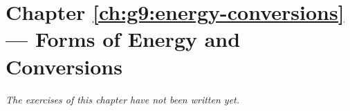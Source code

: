 \section*{Chapter \ref{ch:g9:energy-conversions} --- Forms of Energy and Conversions}


\emph{The exercises of this chapter have not been written yet.}
